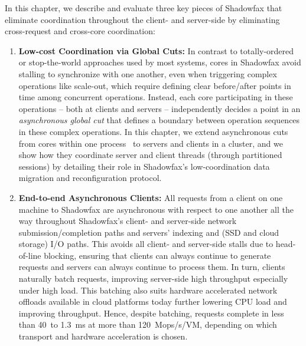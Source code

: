 In this chapter, we describe and evaluate three key pieces of Shadowfax that
eliminate coordination throughout the client- and server-side by eliminating
cross-request and cross-core coordination:
%
\begin{enumerate}
\item {\bf Low-cost Coordination via Global Cuts:}
%
In contrast to totally-ordered or stop-the-world approaches used by most
systems, cores in Shadowfax avoid stalling to synchronize with one another, even when
triggering complex operations like scale-out, which require
defining clear before/after points in time among concurrent operations.
%
Instead, each core participating in these operations -- both at clients and
servers -- independently decides a point in an \emph{asynchronous global
cut} that defines a boundary between operation sequences in these complex operations.
%
In this chapter, we extend asynchronous cuts from cores within one
process~\cite{faster,cpr} to servers
and clients in a cluster, and we show how they coordinate server
and client threads (through partitioned sessions) by detailing
their role in Shadowfax's low-coordination data migration and
reconfiguration protocol.

%

\item {\bf End-to-end Asynchronous Clients:}
All requests from a client on one machine to Shadowfax are asynchronous with
respect to one another all the way throughout Shadowfax's client- and
server-side network submission/completion paths and servers' indexing and
(SSD and cloud storage) I/O paths.
%
This avoids all client- and server-side stalls due to head-of-line
blocking, ensuring that clients can always continue to generate requests and
servers can always continue to process them.
%
In turn, clients naturally batch requests, improving server-side high
throughput especially under high load.
%
This batching also suits hardware accelerated network offloads available in
cloud platforms today further lowering CPU load and improving throughput.
%
Hence, despite batching, requests complete in less than 40~\us to 1.3~ms at
more than 120~Mops/s/VM, depending on which transport and hardware
acceleration is chosen.
%


\end{enumerate}
